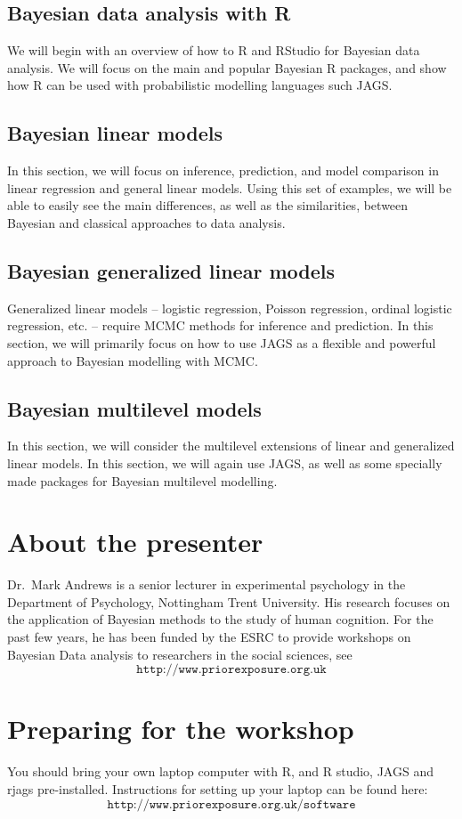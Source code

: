 \documentclass{mjandrews.notes.nomp}
\begin{document}
\subsection{Bayesian data analysis with R}

We will begin with an overview of how to R and RStudio for Bayesian data
analysis. We will focus on the main and popular Bayesian R packages, and show
how R can be used with probabilistic modelling languages such JAGS.

\subsection{Bayesian linear models}

In this section, we will focus on inference, prediction, and model comparison
in linear regression and general linear models. Using this set of examples, we
will be able to easily see the main differences, as well as the similarities,
between Bayesian and classical approaches to data analysis.

\subsection{Bayesian generalized linear models}

Generalized linear models -- logistic regression, Poisson regression, ordinal
logistic regression, etc. -- require MCMC methods for inference and prediction.
In this section, we will primarily focus on how to use JAGS as a flexible and
powerful approach to Bayesian modelling with MCMC.

\subsection{Bayesian multilevel models}

In this section, we will consider the multilevel extensions of linear and
generalized linear models. In this section, we will again use JAGS, as well as
some specially made packages for Bayesian multilevel modelling.


\section*{About the presenter}

Dr.\ Mark Andrews is a senior lecturer in experimental psychology in the
Department of Psychology, Nottingham Trent University. His research focuses on
the application of Bayesian methods to the study of human cognition. For the
past few years, he has been funded by the ESRC to provide workshops on Bayesian
Data analysis to researchers in the social sciences, see
\[
\texttt{http://www.priorexposure.org.uk}
\]



\section*{Preparing for the workshop}

You should bring your own laptop computer with R, and R studio, JAGS and rjags
pre-installed. Instructions for setting up your laptop can be found here:
\[
\texttt{http://www.priorexposure.org.uk/software}
\]
\end{document}
